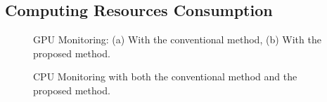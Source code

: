  \subsection{Computing Resources Consumption}
\begin{figure}
\centering
{}
\caption{GPU Monitoring: (a)  With the conventional method, (b)  With the proposed method.}
\label{fig:gpu}
\end{figure}
\begin{figure}
\centering
{}
\caption{CPU Monitoring with both the conventional method and the proposed method.}
\label{fig:cpu}
\end{figure}
